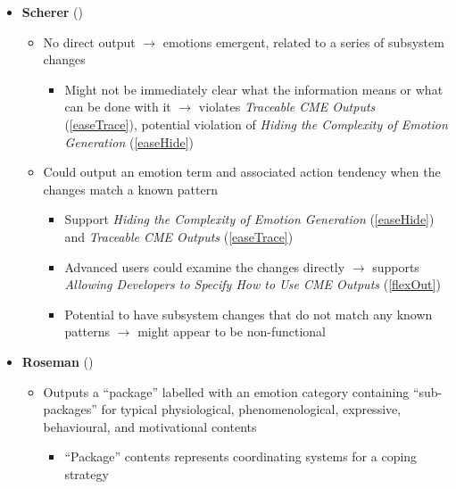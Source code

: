 \begin{itemize}
    \item \textbf{Scherer} (\weak)
    \begin{itemize}
        \item No direct output $\rightarrow$ emotions emergent, related to a
        series of subsystem changes~\citep[p.~113]{scherer2001appraisalB}
        \begin{itemize}
            \item Might not be immediately clear what the information means or
            what can be done with it $\rightarrow$ violates
            \textit{Traceable CME Outputs} (\ref{easeTrace}), potential
            violation of \textit{Hiding the Complexity of Emotion Generation}
            (\ref{easeHide})
        \end{itemize}

        \item Could output an emotion term and associated action tendency
        when the changes match a known
        pattern~\citep[p.~117]{scherer2001appraisalB}
        \begin{itemize}
            \item Support \textit{Hiding the Complexity of Emotion Generation}
            (\ref{easeHide}) and \textit{Traceable CME Outputs}
            (\ref{easeTrace})

            \item Advanced users could examine the changes directly
            $\rightarrow$ supports \textit{Allowing Developers to Specify
                How to Use CME Outputs} (\ref{flexOut})

            \item Potential to have subsystem changes that do not match any
            known patterns $\rightarrow$ \progname{} might appear to be
            non-functional
        \end{itemize}
    \end{itemize}

    \item \textbf{Roseman} (\strong)
    \begin{itemize}
        \item Outputs a ``package'' labelled with an emotion category
        containing ``sub-packages'' for typical physiological,
        phenomenological, expressive, behavioural, and motivational
        contents~\citep[p.~75]{roseman2001model}
        \begin{itemize}
            \item ``Package'' contents represents coordinating systems for a
            coping strategy~\citep[p.~141]{roseman2013appraisal}


\end{itemize}
\end{itemize}
\end{itemize}
